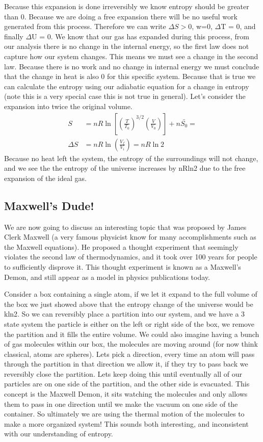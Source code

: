 \documentclass{article}
\begin{document}
Because this expansion is done irreversibly we know entropy should be greater than 0. 
Because we are doing a free expansion there will be no useful work generated from this process. 
Therefore we can write $\Delta S > 0$, w=0, $\Delta$T = 0, and finally $\Delta$U = 0. 
We know that our gas has expanded during this process, from our analysis there is no change in the internal energy, so the first law does not capture how our system changes. 
This means we must see a change in the second law. 
Because there is no work and no change in internal energy we must conclude that the change in heat is also 0 for this specific system.
Because that is true we can calculate the entropy using our adiabatic equation for a change in entropy (note this is a very special case this is not true in general). 
Let's consider the expansion into twice the original volume. 
\begin{equation}
\begin{split}
S &= nR\ln\left[ \left(\frac{T}{T_0} \right)^{3/2} \left(\frac{V}{V_0} \right) \right ] + n\bar{S_0} =\\
\Delta S &= nR\ln \left (\frac{V_f}{V_i} \right) = nR\ln 2
\end{split}
\end{equation}
Because no heat left the system, the entropy of the surroundings will not change, and we see the the entropy of the universe increases by nRln2 due to the free expansion of the ideal gas.  

\subsection*{Maxwell's Dude!}
We are now going to discuss an interesting topic that was proposed by James Clerk Maxwell (a very famous physicist know for many accomplishments such as the Maxwell equations). 
He proposed a thought experiment that seemingly violates the second law of thermodynamics, and it took over 100 years for people to sufficiently disprove it. 
This thought experiment is known as a Maxwell's Demon, and still appear as a model in physics publications today.

Consider a box containing a single atom, if we let it expand to the full volume of the box we just showed above that the entropy change of the universe would be kln2. 
So we can reversibly place a partition into our system, and we have a 3 state system the particle is either on the left or right side of the box, we remove the partition and it fills the entire volume. 
We could also imagine having a bunch of gas molecules within our box, the molecules are moving around (for now think classical, atoms are spheres). 
Lets pick a direction, every time an atom will pass through the partition in that direction we allow it, if they try to pass back we reversibly close the partition. 
Lets keep doing this until eventually all of our particles are on one side of the partition, and the other side is evacuated. 
This concept is the Maxwell Demon, it sits watching the molecules and only allows them to pass in one direction until we make the vacuum on one side of the container. 
So ultimately we are using the thermal motion of the molecules to make a more organized system!
This sounds both interesting, and inconsistent with our understanding of entropy. 
\end{document}
